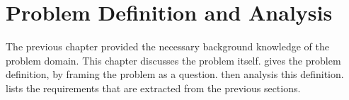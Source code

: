 \chapter{Problem Definition and Analysis}
\label{cha:probl-defin-analys}

The previous chapter provided the necessary background knowledge of the problem
domain. This chapter discusses the problem itself. 
gives the problem definition, by framing the problem as a question.
 then analysis this definition.
 lists the requirements that are extracted from
the previous sections.





